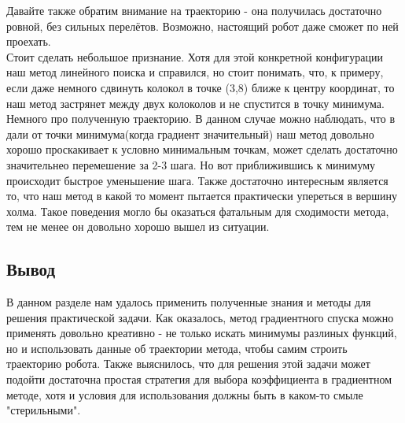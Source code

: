 \documentclass[a4paper,12pt]{article}
\begin{document}
Давайте также обратим внимание на траекторию - она получилась достаточно ровной, без сильных перелётов. Возможно, настоящий робот даже сможет по ней проехать. \\[0.5em]
Стоит сделать небольшое признание. Хотя для этой конкретной конфигурации наш метод линейного поиска и справился, но стоит понимать, что, к примеру, если даже немного сдвинуть колокол в точке (3,8) ближе к центру координат, то наш метод застрянет между двух колоколов и не спустится в точку минимума. \\[0.5em]
Немного про полученную траекторию. В данном случае можно наблюдать, что в дали от точки минимума(когда градиент значительный) наш метод довольно хорошо проскакивает к условно минимальным точкам, может сделать достаточно значительнео перемешение за 2-3 шага. Но вот приближившись к минимуму происходит быстрое уменьшение шага. Также достаточно интересным является то, что наш метод в какой то момент пытается практически упереться в вершину холма. Такое поведения могло бы оказаться фатальным для сходимости метода, тем не менее он довольно хорошо вышел из ситуации.
\subsection{Вывод}
В данном разделе нам удалось применить полученные знания и методы для решения практической задачи. Как оказалось, метод градиентного спуска можно применять довольно креативно - не только искать минимумы разлиных функций, но и использовать данные об траектории метода, чтобы самим строить траекторию робота. Также выяснилось, что для решения этой задачи может подойти достаточна простая стратегия для выбора коэффициента в градиентном методе, хотя и условия для использования должны быть в каком-то смыле "стерильными".
\end{document}
